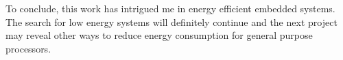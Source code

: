 
To conclude, this work has intrigued me in energy efficient embedded systems. The search for low energy systems will definitely continue and the next project may reveal other ways to reduce energy consumption for general purpose processors. 






